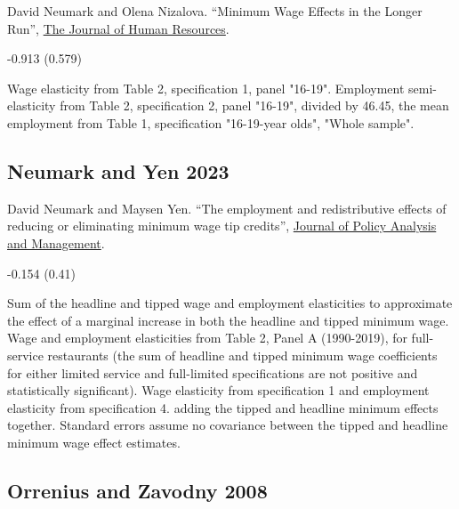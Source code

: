 \noindent David Neumark and Olena Nizalova. ``Minimum Wage Effects in the Longer Run'', \href{https://doi.org/10.3368/jhr.XLII.2.435}{The Journal of Human Resources}.

\vspace{0.7em}

 -0.913 (0.579)

\vspace{0.7em}

 Wage elasticity from Table 2, specification 1, panel "16-19". Employment semi-elasticity from Table 2, specification 2, panel "16-19", divided by 46.45, the mean employment from Table 1, specification "16-19-year olds", "Whole sample".

\subsection*{Neumark and Yen 2023}
\vspace{-0.7em}

\noindent David Neumark and Maysen Yen. ``The employment and redistributive effects of reducing or eliminating minimum wage tip credits'', \href{https://doi.org/10.1002/pam.22450}{Journal of Policy Analysis and Management}.

\vspace{0.7em}

 -0.154 (0.41)

\vspace{0.7em}

 Sum of the headline and tipped wage and employment elasticities to approximate the effect of a marginal increase in both the headline and tipped minimum wage. Wage and employment elasticities from Table 2, Panel A (1990-2019), for full-service restaurants (the sum of headline and tipped minimum wage coefficients for either limited service and full-limited specifications are not positive and statistically significant). Wage elasticity from specification 1 and employment elasticity from specification 4. adding the tipped and headline minimum effects together. Standard errors assume no covariance between the tipped and headline minimum wage effect estimates.

\subsection*{Orrenius and Zavodny 2008}
\vspace{-0.7em}

